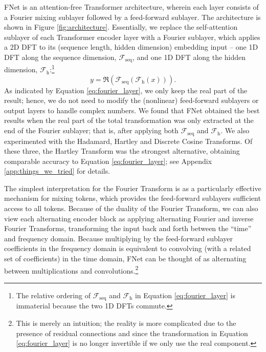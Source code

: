 FNet is an attention-free Transformer architecture, wherein each layer consists of a Fourier mixing sublayer followed by a feed-forward sublayer. The architecture is shown in Figure \ref{fig:architecture}. Essentially, we replace the self-attention sublayer of each Transformer encoder layer with a Fourier sublayer, which applies a 2D DFT to its (sequence length, hidden dimension) embedding input -- one 1D DFT along the sequence dimension, $\mathcal{F}_{\textrm{seq}}$, and one 1D DFT along the hidden dimension, $\mathcal{F}_{\textrm{h}}$:\footnote{The relative ordering of $\mathcal{F}_{\textrm{seq}}$ and $\mathcal{F}_{\textrm{h}}$ in Equation \eqref{eq:fourier_layer} is immaterial because the two 1D DFTs commute.}
\begin{equation}
    \label{eq:fourier_layer}
    y = \Re\left(\mathcal{F}_{\textrm{seq}}\left(\mathcal{F}_{\textrm{h}} (x)\right) \right) .
\end{equation}
As indicated by Equation \eqref{eq:fourier_layer}, we only keep the real part of the result; hence, we do not need to modify the (nonlinear) feed-forward sublayers or output layers to handle complex numbers. We found that FNet obtained the best results when the real part of the total transformation was only extracted at the end of the Fourier sublayer; that is, after applying both $\mathcal{F}_{\textrm{seq}}$ and $\mathcal{F}_{\textrm{h}}$.
We also experimented with the Hadamard, Hartley and Discrete Cosine Transforms. Of these three, the Hartley Transform was the strongest alternative, obtaining comparable accuracy to Equation \eqref{eq:fourier_layer}; see Appendix \ref{app:things_we_tried} for details.

The simplest interpretation for the Fourier Transform is as a particularly effective mechanism for mixing tokens, which  provides the feed-forward sublayers sufficient access to all tokens. Because of the duality of the Fourier Transform, we can also view each alternating encoder block as applying alternating Fourier and inverse Fourier Transforms, transforming the input back and forth between the ``time'' and frequency domain. Because multiplying by the feed-forward sublayer coefficients in the frequency domain is equivalent to convolving (with a related set of coefficients) in the time domain, FNet can be thought of as alternating between multiplications and  %
convolutions.\footnote{This is merely an intuition; the reality is more complicated due to the presence of residual connections and since the transformation in Equation \eqref{eq:fourier_layer} is no longer invertible if we only use the real component.}

